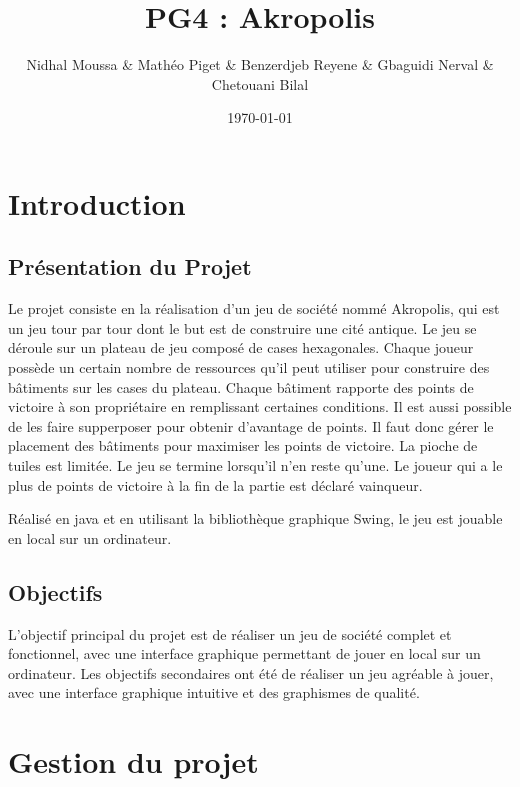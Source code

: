 \documentclass{article}
\title{PG4 : Akropolis}
\author{Nidhal Moussa \& Mathéo Piget \& Benzerdjeb Reyene \& Gbaguidi Nerval \& Chetouani Bilal
}
\date{\today}
\begin{document}
    \maketitle

    \tableofcontents

    \newpage

    \section{Introduction}\label{sec:introduction}

    \subsection{Présentation du Projet}\label{subsec:presentation-du-projet}
    Le projet consiste en la réalisation d'un jeu de société nommé Akropolis, qui est un jeu tour par tour dont le but est de construire une cité antique.
    Le jeu se déroule sur un plateau de jeu composé de cases hexagonales.
    Chaque joueur possède un certain nombre de ressources qu'il peut utiliser pour construire des bâtiments sur les cases du plateau.
    Chaque bâtiment rapporte des points de victoire à son propriétaire en remplissant certaines conditions.
    Il est aussi possible de les faire supperposer pour obtenir d'avantage de points.
    Il faut donc gérer le placement des bâtiments pour maximiser les points de victoire.
    La pioche de tuiles est limitée. Le jeu se termine lorsqu'il n'en reste qu'une.
    Le joueur qui a le plus de points de victoire à la fin de la partie est déclaré vainqueur.

    Réalisé en java et en utilisant la bibliothèque graphique Swing, le jeu est jouable en local sur un ordinateur.

    \subsection{Objectifs}\label{subsec:obectifs}

    L'objectif principal du projet est de réaliser un jeu de société complet et fonctionnel, avec une interface graphique permettant de jouer en local sur un ordinateur.
    Les objectifs secondaires ont été de réaliser un jeu agréable à jouer, avec une interface graphique intuitive et des graphismes de qualité.

    \section{Gestion du projet}\label{sec:gestion-du-projet}
\end{document}

